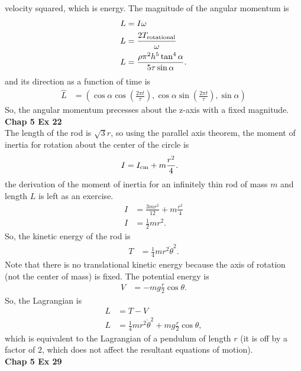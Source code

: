 \documentclass[10pt]{article}
\begin{document}
velocity squared, which is energy.
The magnitude of the angular momentum is
\begin{align*}
  L &= I\omega\\
  L &= \frac{2T_{\rm{rotational}}}{\omega}\\
  L &= \frac{\rho\pi^2 h^5 \tan^4\alpha}{5\tau\sin\alpha}.
\end{align*}
and its direction as a function of time is
\begin{align*}
  \hat{L} &= (\cos\alpha\cos\left( \frac{2\pi t}{\tau} \right),\cos\alpha\sin\left( \frac{2\pi t}{\tau}\right),\sin\alpha)
\end{align*}
So, the angular momentum precesses about the z-axis with a fixed magnitude.
\textbf{Chap 5 Ex 22}\\
The length of the rod is $\sqrt{3}r$, so using the parallel axis theorem, 
the moment of inertia for rotation about the center of the circle is
\begin{align*}
  I &= I_{\rm{cm}} + m\frac{r^2}{4}.
\end{align*}
the derivation of the moment of inertia for an infinitely thin rod of mass
$m$ and length $L$ is left as an exercise.
\begin{align*}
  I &= \frac{3mr^2}{12} + m\frac{r^2}{4}\\
  I &= \frac{1}{2}mr^2.
\end{align*}
So, the kinetic energy of the rod is 
\begin{align*}
  T &= \frac{1}{4}mr^2\dot\theta^2.
\end{align*}
Note that there is no translational kinetic energy because the axis of 
rotation (not the center of mass) is fixed.  The potential energy is
\begin{align*}
  V &= -mg\frac{r}{2}\cos\theta.
\end{align*}
So, the Lagrangian is 
\begin{align*}
  L &= T-V\\
  L &= \frac{1}{4}mr^2\dot\theta^2+mg\frac{r}{2}\cos\theta,
\end{align*}
which is equivalent to the Lagrangian of a pendulum of length
$r$ (it is off by a factor of 2, which does not affect the resultant
equations of motion).\\
\textbf{Chap 5 Ex 29}\\
\end{document}
